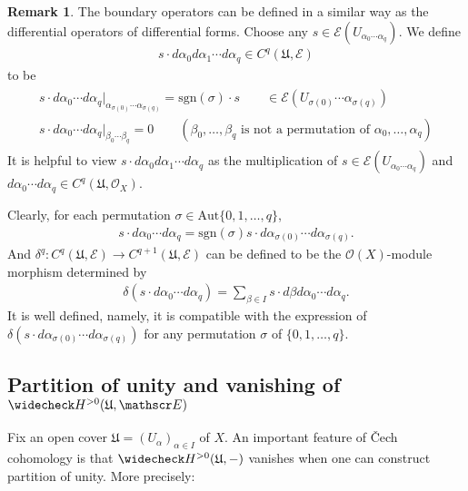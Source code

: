 \documentclass[12pt,b5paper,notitlepage]{report}
\theoremstyle{definition}
\newtheorem{rem}[df]{Remark}
\theoremstyle{plain}
\newcommand{\fk}{\mathfrak}
\newcommand{\wch}{\widecheck}
\newcommand{\scr}{\mathscr}
\newcommand{\sgn}{\mathrm{sgn}}
\newcommand{\Aut}{\mathrm{Aut}}
\numberwithin{equation}{section}
\begin{document}
\begin{rem}
The boundary operators can be defined in a similar way as the differential operators of differential forms. Choose any $s\in\scr E(U_{\alpha_0\cdots\alpha_q})$. We define \index{sda@$sd\alpha_0d\alpha_1\cdots d\alpha_q\in C^q(\fk U,\scr E)$} 
\begin{align*}
s\cdot d\alpha_0d\alpha_1\cdots d\alpha_q\in C^q(\fk U,\scr E)
\end{align*}
to be
\begin{gather}
\begin{gathered}
s\cdot d\alpha_0\cdots d\alpha_q|_{\alpha_{\sigma(0)}\cdots\alpha_{\sigma(q)}}=\sgn(\sigma)\cdot s\qquad\in \scr E(U_{\sigma(0)}\cdots\alpha_{\sigma(q)})\\
s\cdot d\alpha_0\cdots d\alpha_q|_{\beta_0\cdots\beta_q}=0\qquad(\beta_0,\dots,\beta_q\text{ is not a permutation of }\alpha_0,\dots,\alpha_q)
\end{gathered}
\end{gather}
It is helpful to view $s\cdot d\alpha_0d\alpha_1\cdots d\alpha_q$ as the multiplication of $s\in\scr E(U_{\alpha_0\cdots\alpha_q})$ and $d\alpha_0\cdots d\alpha_q\in C^q(\fk U,\scr O_X)$.

Clearly, for each permutation $\sigma\in\Aut\{0,1,\dots,q\}$,
\begin{align*}
s\cdot d\alpha_0\cdots d\alpha_q=\sgn(\sigma)s\cdot d\alpha_{\sigma(0)}\cdots d\alpha_{\sigma(q)}.
\end{align*}
And $\delta^q:C^q(\fk U,\scr E)\rightarrow C^{q+1}(\fk U,\scr E)$ can be defined to be the $\scr O(X)$-module morphism determined by
\begin{align}
\delta(s\cdot d\alpha_0\cdots d\alpha_q)=\sum_{\beta\in I}s\cdot d\beta d\alpha_0\cdots d\alpha_q.  \label{eq141}
\end{align}
It is well defined, namely, it is compatible with the expression of $\delta(s\cdot d\alpha_{\sigma(0)}\cdots d\alpha_{\sigma(q)})$ for any permutation $\sigma$ of $\{0,1,\dots,q\}$. \hfill\qedsymbol
\end{rem}

\subsection{Partition of unity and vanishing of $\wch H^{>0}(\fk U,\scr E)$}


Fix an open cover $\fk U=(U_\alpha)_{\alpha\in I}$ of $X$. An important feature of \v Cech cohomology is that $\wch H^{>0}(\fk U,-)$ vanishes when one can construct partition of unity. More precisely:
\end{document}
